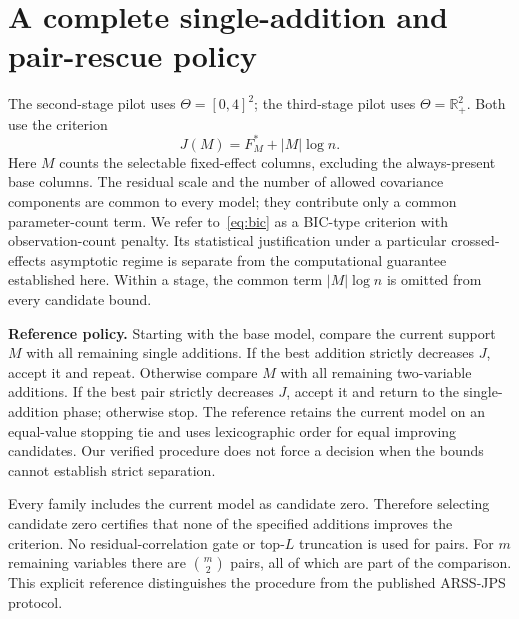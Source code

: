\documentclass[11pt,a4paper]{article}
\theoremstyle{remark}\newtheorem{remark}[theorem]{Remark}
\newcommand{\R}{\mathbb R}
\begin{document}
\section{A complete single-addition and pair-rescue policy}
The second-stage pilot uses $\Theta=[0,4]^2$; the third-stage pilot uses
$\Theta=\R_+^2$. Both use the criterion
\begin{equation}\label{eq:bic}
J(M)=F_M^*+|M|\log n.
\end{equation}
Here $M$ counts the selectable fixed-effect columns, excluding the always-present
base columns. The residual scale and the number of allowed covariance components
are common to every model; they contribute only a common parameter-count term.
We refer to~\eqref{eq:bic} as a BIC-type criterion with observation-count penalty.
Its statistical justification under a particular crossed-effects asymptotic regime
is separate from the computational guarantee established here. Within a stage,
the common term $|M|\log n$ is omitted from every candidate bound.

\textbf{Reference policy.} Starting with the base model, compare the current
support $M$ with all remaining single additions. If the best addition strictly
decreases $J$, accept it and repeat. Otherwise compare $M$ with all remaining
two-variable additions. If the best pair strictly decreases $J$, accept it and
return to the single-addition phase; otherwise stop. The reference retains the
current model on an equal-value stopping tie and uses lexicographic order for
equal improving candidates. Our verified procedure does not force a decision
when the bounds cannot establish strict separation.

Every family includes the current model as candidate zero. Therefore selecting
candidate zero certifies that none of the specified additions improves the
criterion. No residual-correlation gate or top-$L$ truncation is used for pairs.
For $m$ remaining variables there are $\binom{m}{2}$ pairs, all of which are part
of the comparison. This explicit reference distinguishes the procedure from
the published ARSS-JPS protocol.
\end{document}
